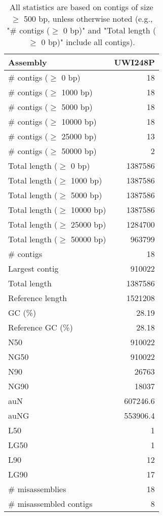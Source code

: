 \documentclass[12pt,a4paper]{article}
\begin{document}
\begin{table}[ht]
\begin{center}
\caption{All statistics are based on contigs of size $\geq$ 500 bp, unless otherwise noted (e.g., "\# contigs ($\geq$ 0 bp)" and "Total length ($\geq$ 0 bp)" include all contigs).}
\begin{tabular}{|l*{1}{|r}|}
\hline
Assembly & UWI248P \\ \hline
\# contigs ($\geq$ 0 bp) & 18 \\ \hline
\# contigs ($\geq$ 1000 bp) & 18 \\ \hline
\# contigs ($\geq$ 5000 bp) & 18 \\ \hline
\# contigs ($\geq$ 10000 bp) & 18 \\ \hline
\# contigs ($\geq$ 25000 bp) & 13 \\ \hline
\# contigs ($\geq$ 50000 bp) & 2 \\ \hline
Total length ($\geq$ 0 bp) & 1387586 \\ \hline
Total length ($\geq$ 1000 bp) & 1387586 \\ \hline
Total length ($\geq$ 5000 bp) & 1387586 \\ \hline
Total length ($\geq$ 10000 bp) & 1387586 \\ \hline
Total length ($\geq$ 25000 bp) & 1284700 \\ \hline
Total length ($\geq$ 50000 bp) & 963799 \\ \hline
\# contigs & 18 \\ \hline
Largest contig & 910022 \\ \hline
Total length & 1387586 \\ \hline
Reference length & 1521208 \\ \hline
GC (\%) & 28.19 \\ \hline
Reference GC (\%) & 28.18 \\ \hline
N50 & 910022 \\ \hline
NG50 & 910022 \\ \hline
N90 & 26763 \\ \hline
NG90 & 18037 \\ \hline
auN & 607246.6 \\ \hline
auNG & 553906.4 \\ \hline
L50 & 1 \\ \hline
LG50 & 1 \\ \hline
L90 & 12 \\ \hline
LG90 & 17 \\ \hline
\# misassemblies & 18 \\ \hline
\# misassembled contigs & 8 \\ \hline

\end{tabular}
\end{center}
\end{table}
\end{document}

